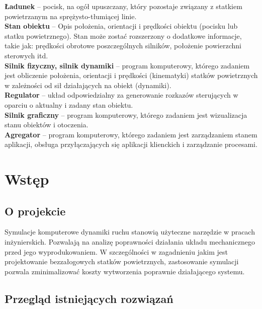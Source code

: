 \documentclass[15pt]{sprawozdanie}
\begin{document}
\textbf{Ładunek} -- pocisk, na ogół upuszczany, który pozostaje związany z statkiem powietrzanym na sprężysto-tłumiącej linie. \\

\textbf{Stan obiektu} -- Opis położenia, orientacji i prędkości obiektu (pocisku lub statku powietrznego). Stan może zostać rozszerzony o dodatkowe informacje, takie jak: prędkości obrotowe poszczególnych silników, położenie powierzchni sterowych itd. \\

\textbf{Silnik fizyczny, silnik dynamiki} -- program komputerowy, którego zadaniem jest obliczenie położenia, orientacji i prędkości (kinematyki) statków powietrznych w zależności od sił działających na obiekt (dynamiki). \\

\textbf{Regulator} -- układ odpowiedzialny za generowanie rozkazów sterujących w oparciu o aktualny i zadany stan obiektu.\\

\textbf{Silnik graficzny} -- program komputerowy, którego zadaniem jest wizualizacja stanu obiektów i otoczenia.\\

\textbf{Agregator} --  program komputerowy, którego zadaniem jest zarządzaniem stanem aplikacji, obsługa przyłączających się aplikacji klienckich i zarządzanie procesami.\\


\newpage

\section{Wstęp}

\subsection{O projekcie}

Symulacje komputerowe dynamiki ruchu stanowią użyteczne narzędzie w pracach inżynierskich. Pozwalają na analizę poprawności działania układu mechanicznego przed jego wyprodukowaniem. W szczególności w zagadnieniu jakim jest projektowanie bezzałogowych statków powietrznych, zastosowanie symulacji pozwala zminimalizować koszty wytworzenia poprawnie działającego systemu.

\subsection{Przegląd istniejących rozwiązań}
\end{document}
